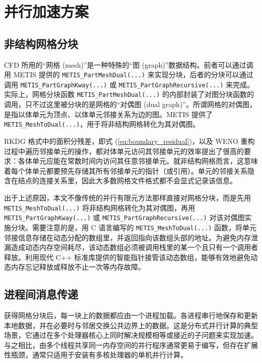 \section{并行加速方案\label{sec:parallel}}



\subsection{非结构网格分块}

CFD 所用的“网格 (mesh)”是一种特殊的“图 (graph)”数据结构。前者可以通过调用
METIS 提供的 \texttt{METIS\_PartMeshDual(...)} 来实现分块，后者的分块可以通过调用
\texttt{METIS\_PartGraphKway(...)} 或 \texttt{METIS\_PartGraphRecursive(...)}
来完成。实际上，网格分块函数 \texttt{METIS\_PartMeshDual(...)} 的内部封装了对图分块函数的调用，只不过这里被分块的是网格的“对偶图
(dual graph)”。所谓网格的对偶图，是指以体单元为顶点、以体单元邻接关系为边的图。METIS 提供了 \texttt{METIS\_MeshToDual(...)}，用于将非结构网格转化为其对偶图。

RKDG 格式中的面积分残差，即式 (\ref{eq:boundary_residual})，以及 WENO 重构过程中遍历邻接单元的操作，都对体单元访问其邻接单元的效率提出了很高的要求：各体单元应能在常数时间内访问其任意邻接单元。就非结构网格而言，这意味着每个体单元都要预先存储其所有邻接单元的指针（或引用）。单元的邻接关系隐含在结点的连接关系里，因此大多数网格文件格式都不会显式记录该信息。

出于上述原因，本文不像传统的并行有限元方法那样直接对网格分块，而是先用 \texttt{METIS\_MeshToDual(...)}
将非结构网格转化为其对偶图，再用 \texttt{METIS\_PartGraphKway(...)} 或 \texttt{METIS\_PartGraphRecursive(...)}
对该对偶图实施分块。需要注意的是，用 C 语言编写的 \texttt{METIS\_MeshToDual(...)} 函数，将单元邻接信息存储在动态分配的数组里，并返回指向该数组头部的地址。为避免内存泄漏造成动态内存空间耗尽，该动态数组必须被调用栈里的某一个且只有一个调用者释放。利用现代
C++ 标准库提供的智能指针接管该动态数组，能够有效地避免动态内存忘记释放或释放不止一次等内存故障。

\subsection{进程间消息传递}

获得网格分块后，每一块上的数据都应由一个进程加载。各进程串行地保存和更新本地数据，并在必要时与邻居交换公共边界上的数据。这是分布式并行计算的典型场景，它通过在多个处理器核心上同时解决规模相等或接近的子问题来实现加速。与之相比，由多个线程共享同一内存空间的并行程序通常更易于编写，但存在扩展性瓶颈，通常只适用于安装有多核处理器的单机并行计算。

